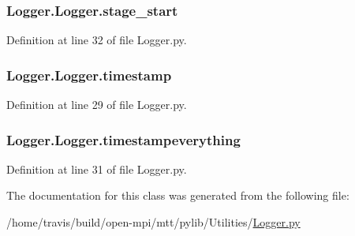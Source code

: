 \hypertarget{classLogger_1_1Logger_a639adf5e0d4f73bdb942e9652903231f}{
\subsubsection[{stage\-\_\-start}]{\setlength{\rightskip}{0pt plus 5cm}Logger.\-Logger.\-stage\-\_\-start}}\label{classLogger_1_1Logger_a639adf5e0d4f73bdb942e9652903231f}


Definition at line 32 of file Logger.\-py.

\hypertarget{classLogger_1_1Logger_af1d68b73fec8eebd0abeafa3bc8fd98b}{
\subsubsection[{timestamp}]{\setlength{\rightskip}{0pt plus 5cm}Logger.\-Logger.\-timestamp}}\label{classLogger_1_1Logger_af1d68b73fec8eebd0abeafa3bc8fd98b}


Definition at line 29 of file Logger.\-py.

\hypertarget{classLogger_1_1Logger_a6012f50ab21e5ab3b89465a972b6a99d}{
\subsubsection[{timestampeverything}]{\setlength{\rightskip}{0pt plus 5cm}Logger.\-Logger.\-timestampeverything}}\label{classLogger_1_1Logger_a6012f50ab21e5ab3b89465a972b6a99d}


Definition at line 31 of file Logger.\-py.



The documentation for this class was generated from the following file\-:\begin{DoxyCompactItemize}
\item 
/home/travis/build/open-\/mpi/mtt/pylib/\-Utilities/\hyperlink{Logger_8py}{Logger.\-py}\end{DoxyCompactItemize}
